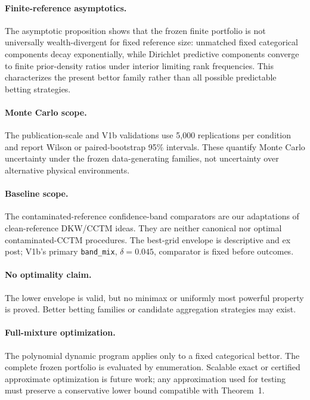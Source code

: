 \paragraph{Finite-reference asymptotics.}
The asymptotic proposition shows that the frozen finite portfolio is not universally wealth-divergent for fixed reference size: unmatched fixed categorical components decay exponentially, while Dirichlet predictive components converge to finite prior-density ratios under interior limiting rank frequencies. This characterizes the present bettor family rather than all possible predictable betting strategies.

\paragraph{Monte Carlo scope.}
The publication-scale and V1b validations use 5,000 replications per condition and report Wilson or paired-bootstrap 95\% intervals. These quantify Monte Carlo uncertainty under the frozen data-generating families, not uncertainty over alternative physical environments.

\paragraph{Baseline scope.}
The contaminated-reference confidence-band comparators are our adaptations of clean-reference DKW/CCTM ideas. They are neither canonical nor optimal contaminated-CCTM procedures. The best-grid envelope is descriptive and ex post; V1b's primary \texttt{band\_mix}, \(\delta=0.045\), comparator is fixed before outcomes.

\paragraph{No optimality claim.}
The lower envelope is valid, but no minimax or uniformly most powerful property is proved. Better betting families or candidate aggregation strategies may exist.

\paragraph{Full-mixture optimization.}
The polynomial dynamic program applies only to a fixed categorical bettor. The complete frozen portfolio is evaluated by enumeration. Scalable exact or certified approximate optimization is future work; any approximation used for testing must preserve a conservative lower bound compatible with Theorem~1.


